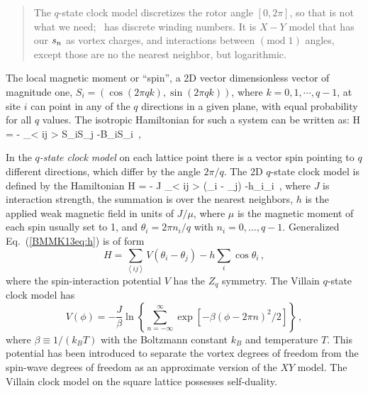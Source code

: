 \begin{quote}
The $q$-state clock model discretizes the rotor angle $[0,2\pi]$, so that
is not what we need; \catlatt\ has discrete winding numbers. It is $X-Y$
model that has our ${s_{n}}$ as vortex charges, and interactions between
$(\mbox{mod}\;1)$ angles, except those are no the nearest neighbor, but
logarithmic.
\end{quote}

The local magnetic moment or ``spin'', a 2D vector dimensionless vector
of magnitude one, $S_i=(\cos( 2\pi q k), \sin( 2\pi q k))$, where
$k=0,1,\cdots,q-1$, at site $i$ can point in any of the $q$ directions in
a given plane, with equal probability for all $q$ values. The isotropic
Hamiltonian for such a system can be written as:
\beq
H = -  \sum_{\left< ij \right>} S_i\cdot S_j
-B\cdot\sum_{i}S_i
\,,

In the \emph{$q$-state clock model}  on each lattice point there is a vector
spin pointing to $q$ different directions, which differ by the angle
$2\pi/q$.
The 2D $q$-state clock model is defined by the Hamiltonian
\beq
H = - J \sum_{\left< ij \right>} \cos(\theta_i - \theta_j)
-h\sum_{i}\cos {\theta}_{i}
\,,
where $J$ is interaction strength, the summation is over the nearest
neighbors, $h$ is the applied weak magnetic field in units of $J/\mu$,
where $\mu$ is the magnetic moment of each spin usually set to 1, and
$\theta_i=2\pi{n_i}/q$ with $n_i=0,\ldots,q-1$.
Generalized Eq.~(\ref{BMMK13eq:h}) is of form
\[
H =  \sum_{\left< ij \right>} V(\theta_i - \theta_j)
   -h\sum _{i}\cos {\theta }_{i}
\,,
\]
where the spin-interaction potential $V$ has the $Z_q$ symmetry.
The Villain $q$-state clock model has
\[
V(\phi) = -\frac{J}{\beta} \ln \left\{ \sum_{n=-\infty}^{\infty}
\exp\left[ -\beta (\phi - 2\pi n)^2/2 \right] \right\}
\,,
\]
where  $\beta \equiv 1/(k_B T)$ with the Boltzmann constant $k_B$ and
temperature $T$. This potential has been introduced to separate the
vortex degrees of freedom from the spin-wave degrees of freedom as an
approximate version of the $XY$ model. %
The Villain clock model on the square lattice possesses
self-duality. %

